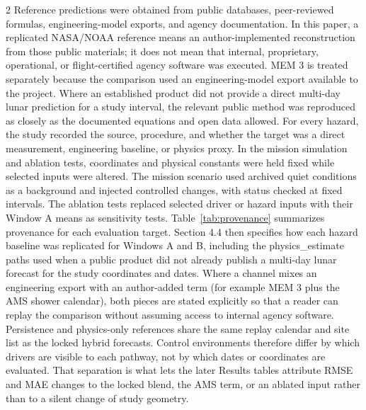 \begin{multicols}{2}
Reference predictions were obtained from public databases, peer-reviewed formulas, engineering-model exports, and agency documentation. In this paper, a replicated NASA/NOAA reference means an author-implemented reconstruction from those public materials; it does not mean that internal, proprietary, operational, or flight-certified agency software was executed. MEM 3 is treated separately because the comparison used an engineering-model export available to the project. Where an established product did not provide a direct multi-day lunar prediction for a study interval, the relevant public method was reproduced as closely as the documented equations and open data allowed. For every hazard, the study recorded the source, procedure, and whether the target was a direct measurement, engineering baseline, or physics proxy. In the mission simulation and ablation tests, coordinates and physical constants were held fixed while selected inputs were altered. The mission scenario used archived quiet conditions as a background and injected controlled changes, with status checked at fixed intervals. The ablation tests replaced selected driver or hazard inputs with their Window A means as sensitivity tests. Table~\ref{tab:provenance} summarizes provenance for each evaluation target. Section 4.4 then specifies how each hazard baseline was replicated for Windows A and B, including the physics\_estimate paths used when a public product did not already publish a multi-day lunar forecast for the study coordinates and dates. Where a channel mixes an engineering export with an author-added term (for example MEM 3 plus the AMS shower calendar), both pieces are stated explicitly so that a reader can replay the comparison without assuming access to internal agency software. Persistence and physics-only references share the same replay calendar and site list as the locked hybrid forecasts. Control environments therefore differ by which drivers are visible to each pathway, not by which dates or coordinates are evaluated. That separation is what lets the later Results tables attribute RMSE and MAE changes to the locked blend, the AMS term, or an ablated input rather than to a silent change of study geometry.
\end{multicols}

